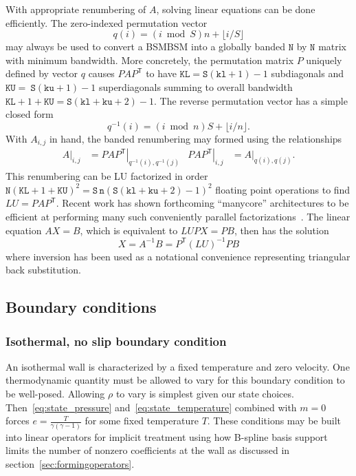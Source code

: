 \documentclass[letterpaper,11pt,nointlimits,reqno,draft]{amsart}
\newcommand{\trans}[1]{{#1}^{\ensuremath{\mathsf{T}}}}
\begin{document}
With appropriate renumbering of $A$, solving linear equations can be done
efficiently.  The zero-indexed permutation vector \[q(i) =
\left(i\bmod{}S\right)n + \lfloor{}i/S\rfloor{}\] may always be used to convert
a BSMBSM into a globally banded $\mathtt{N}$ by $\mathtt{N}$ matrix with
minimum bandwidth.  More concretely, the permutation matrix $P$ uniquely
defined by vector $q$ causes $P A \trans{P}$ to have $\mathtt{KL} =
\mathtt{S}\left(\mathtt{kl}+1\right)-1$ subdiagonals and
$\mathtt{KU}=~\mathtt{S}\left(\mathtt{ku}+1\right)-1$ superdiagonals summing to
overall bandwidth $\mathtt{KL} + 1 + \mathtt{KU} = \mathtt{S}\left(\mathtt{kl}
+ \mathtt{ku} + 2\right)-1$.  The reverse permutation vector has a simple
closed form \[q^{-1}(i) = \left(i\bmod{}n\right)S + \lfloor{}i/n\rfloor{}.\]
With $A_{i,j}$ in hand, the banded renumbering may formed using the
relationships
\begin{align*}
       \left.A\right|_{i,j}
    &= \left.P A \trans{P}\right|_{q^{-1}(i),q^{-1}(j)}
    &
       \left.P A \trans{P}\right|_{i,j}
    &= \left.A\right|_{q(i),q(j)}.
\end{align*}
This renumbering can be LU factorized in order $\mathtt{N}\left(\mathtt{KL} + 1
+ \mathtt{KU}\right)^2 =
\mathtt{S}\,\mathtt{n}\left(\mathtt{S}\left(\mathtt{kl} + \mathtt{ku} +
2\right)-1\right)^2$ floating point operations to find $LU = P A \trans{P}$.
Recent work has shown forthcoming ``manycore'' architectures to be efficient at
performing many such conveniently parallel
factorizations~\citep{Schulz2012Early}.  The linear equation $AX=B$, which is
equivalent to $LUPX=PB$, then has the solution \[X = A^{-1}B =
\trans{P}\left(LU\right)^{-1}PB\] where inversion has been used as a notational
convenience representing triangular back substitution.

\subsection{Boundary conditions}

\subsubsection{Isothermal, no slip boundary condition}

An isothermal wall is characterized by a fixed temperature and zero velocity.
One thermodynamic quantity must be allowed to vary for this boundary condition
to be well-posed.  Allowing $\rho$ to vary is simplest given our state choices.
Then~\eqref{eq:state_pressure} and~\eqref{eq:state_temperature} combined with
$m=0$ forces $e=\frac{T}{\gamma\left(\gamma-1\right)}$ for some fixed
temperature $T$.  These conditions may be built into linear operators for
implicit treatment using how B-spline basis support limits the number of
nonzero coefficients at the wall as discussed in
section~\ref{sec:formingoperators}.
\end{document}

